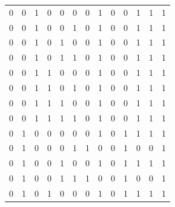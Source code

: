 \documentclass[12pt, letterpaper]{article}
\begin{document}
\begin{table}[H]
\begin{center}
\begin{tabular}{|ccc|ccc|ccc|cccc|}
    \hline
    0 & 0 & 1 & 0 & 0 & 0 & 0 & 1 & 0 & \cellcolor{ForestGreen!90}0 & \cellcolor{ForestGreen!90}1 & \cellcolor{ForestGreen!90}1 & \cellcolor{ForestGreen!90}1 \\
    0 & 0 & 1 & 0 & 0 & 1 & 0 & 1 & 0 & \cellcolor{ForestGreen!90}0 & \cellcolor{ForestGreen!90}1 & \cellcolor{ForestGreen!90}1 & \cellcolor{ForestGreen!90}1 \\
    0 & 0 & 1 & 0 & 1 & 0 & 0 & 1 & 0 & \cellcolor{ForestGreen!90}0 & \cellcolor{ForestGreen!90}1 & \cellcolor{ForestGreen!90}1 & \cellcolor{ForestGreen!90}1 \\
    0 & 0 & 1 & 0 & 1 & 1 & 0 & 1 & 0 & \cellcolor{ForestGreen!90}0 & \cellcolor{ForestGreen!90}1 & \cellcolor{ForestGreen!90}1 & \cellcolor{ForestGreen!90}1 \\
    0 & 0 & 1 & 1 & 0 & 0 & 0 & 1 & 0 & \cellcolor{ForestGreen!90}0 & \cellcolor{ForestGreen!90}1 & \cellcolor{ForestGreen!90}1 & \cellcolor{ForestGreen!90}1 \\
    0 & 0 & 1 & 1 & 0 & 1 & 0 & 1 & 0 & \cellcolor{ForestGreen!90}0 & \cellcolor{ForestGreen!90}1 & \cellcolor{ForestGreen!90}1 & \cellcolor{ForestGreen!90}1 \\
    0 & 0 & 1 & 1 & 1 & 0 & 0 & 1 & 0 & \cellcolor{ForestGreen!90}0 & \cellcolor{ForestGreen!90}1 & \cellcolor{ForestGreen!90}1 & \cellcolor{ForestGreen!90}1 \\
    0 & 0 & 1 & 1 & 1 & 1 & 0 & 1 & 0 & \cellcolor{ForestGreen!90}0 & \cellcolor{ForestGreen!90}1 & \cellcolor{ForestGreen!90}1 & \cellcolor{ForestGreen!90}1 \\
    \hline
    0 & 1 & 0 & 0 & 0 & 0 & 0 & 1 & 0 & \cellcolor{ForestGreen!90}1 & \cellcolor{ForestGreen!90}1 & \cellcolor{ForestGreen!90}1 & \cellcolor{ForestGreen!90}1 \\
    0 & 1 & 0 & 0 & 0 & 1 & 1 & 0 & 0 & \cellcolor{ForestGreen!90}1 & \cellcolor{ForestGreen!90}0 & \cellcolor{ForestGreen!90}0 & \cellcolor{ForestGreen!90}1 \\
    0 & 1 & 0 & 0 & 1 & 0 & 0 & 1 & 0 & \cellcolor{ForestGreen!90}1 & \cellcolor{ForestGreen!90}1 & \cellcolor{ForestGreen!90}1 & \cellcolor{ForestGreen!90}1 \\
    0 & 1 & 0 & 0 & 1 & 1 & 1 & 0 & 0 & \cellcolor{ForestGreen!90}1 & \cellcolor{ForestGreen!90}0 & \cellcolor{ForestGreen!90}0 & \cellcolor{ForestGreen!90}1 \\
    0 & 1 & 0 & 1 & 0 & 0 & 0 & 1 & 0 & \cellcolor{ForestGreen!90}1 & \cellcolor{ForestGreen!90}1 & \cellcolor{ForestGreen!90}1 & \cellcolor{ForestGreen!90}1 \\

\end{tabular}
\end{center}
\end{table}
\end{document}
